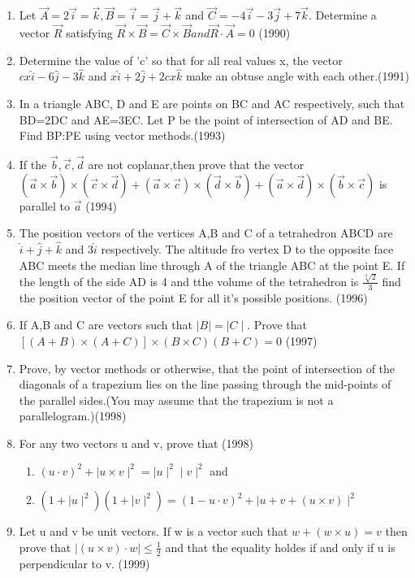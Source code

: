 \documentclass[12pt]{article}
\providecommand{\brak}[1]{\ensuremath{\left(#1\right)}}
\providecommand{\sbrak}[1]{\ensuremath{{}\left[#1\right]}}
\begin{document}
\begin{enumerate}
\item Let $\vec{A}=2\vec{i}=\vec{k},\vec{B}=\vec{i}=\vec{j}+\vec{k}$ and $\vec{C}=-4\vec{i}-3\vec{j}+7\vec{k}$. Determine a vector $\vec{R}$ satisfying $ \vec{R}\times\vec{B}=\vec{C} \times \vec{B} and \vec{R} \cdot \vec{A}=0$ (1990)
\item Determine the value of 'c' so that for all real values x, the vector $cx\hat{i}-6\hat{j}-3\hat{k}$ and $x\hat{i}+2\hat{j}+2cx\hat{k}$ make an obtuse angle with each other.(1991)
\item In a triangle ABC, D and E are points on BC and AC respectively, such that BD=2DC and AE=3EC. Let P be the point of intersection of AD and BE. Find BP:PE using vector methods.(1993)
\item If the $\vec{b},\vec{c},\vec{d}$ are not coplanar,then prove that the vector\\$\brak{\vec{a}\times\vec{b}}\times\brak{\vec{c}\times\vec{d}}+\brak{\vec{a}\times\vec{c}}\times \brak{\vec{d}\times\vec{b}}+\brak{\vec{a}\times\vec{d}}\times\brak{\vec{b}\times\vec{c}}$ is parallel to $\vec{a}$ (1994)
\item The position vectors of the vertices A,B and C of a tetrahedron ABCD are $\hat{i}+\hat{j}+\hat{k}$ and $3\hat{i}$ respectively. The altitude fro vertex D to the opposite face ABC meets the  median line through A of the triangle ABC at the point E. If the length of the side AD is 4 and tthe volume of the tetrahedron is $\frac{\sqrt[2]{2}}{3}$ find the position vector of the point E for all it's possible positions. (1996)
\item If A,B and C are vectors such that $\mid B \mid=\mid C \mid$. Prove that $\sbrak{\brak{A+B}\times\brak{A+C}}\times\brak{B \times C}\brak{B+C}=0$ (1997)
\item Prove, by vector methods or otherwise, that the point of intersection of the diagonals of a trapezium lies on the line passing through the mid-points of the parallel sides.(You may assume that the trapezium is not a parallelogram.)(1998)
\item For any two vectors u and v, prove that (1998)\\ 
\begin{enumerate}
\item $\brak{u\cdot v}^2+\mid u \times v\mid^2=\mid u \mid^2 \mid v\mid^2$ and
\item $\brak{1+\mid u\mid^2}\brak{1+\mid v\mid^2}=\brak{1-u\cdot v}^2+\mid u+v+\brak{u \times v}\mid^2$
\end{enumerate}
\item Let u and v be unit vectors. If w is a vector such that $w +\brak{ w\times u}=v$ then prove that $\mid \brak{u\times v}\cdot w\mid\leq \frac{1}{2}$ and that the equality holdes if and only if u is perpendicular to v. (1999)

\end{enumerate}
\end{document}
